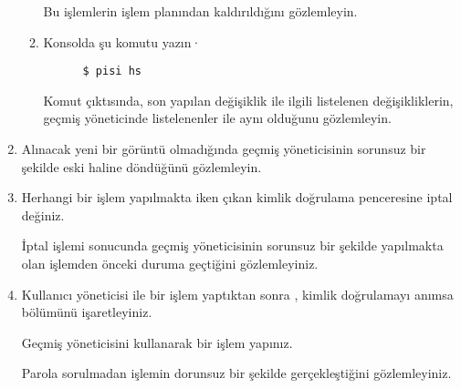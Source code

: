 \documentclass[a4paper,10pt]{article}
\begin{document}
\begin{enumerate}
\begin{enumerate}
	Bu işlemlerin işlem planından kaldırıldığını gözlemleyin.
     	\item Konsolda şu komutu yazın·
      \begin{verbatim}
	  $ pisi hs
      \end{verbatim} 
       Komut çıktısında, son yapılan değişiklik ile ilgili listelenen değişikliklerin, geçmiş yöneticinde listelenenler ile aynı olduğunu gözlemleyin.

\end{enumerate}
\item Alınacak yeni bir görüntü olmadığında geçmiş yöneticisinin sorunsuz bir şekilde eski haline döndüğünü gözlemleyin.

\item Herhangi bir işlem yapılmakta iken çıkan kimlik doğrulama penceresine iptal değiniz.

İptal işlemi sonucunda geçmiş yöneticisinin sorunsuz bir şekilde yapılmakta olan işlemden önceki duruma geçtiğini gözlemleyiniz.

\item Kullanıcı yöneticisi ile bir işlem yaptıktan sonra , kimlik doğrulamayı anımsa bölümünü işaretleyiniz.

Geçmiş yöneticisini kullanarak bir işlem yapınız.

Parola sorulmadan işlemin dorunsuz bir şekilde gerçekleştiğini gözlemleyiniz.
\end{enumerate}
\end{document}
